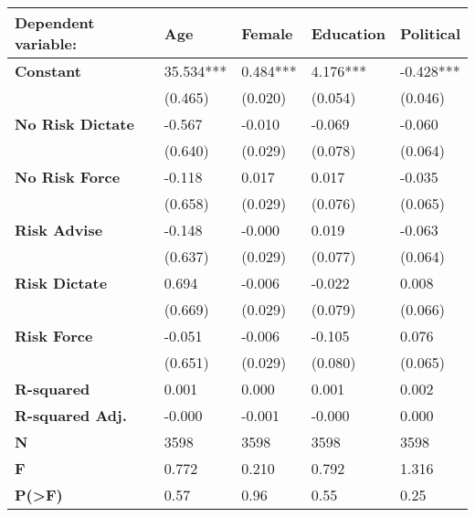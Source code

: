\begin{tabular}{lllll}
\toprule
\textbf{Dependent variable:} &        Age &    Female & Education &  Political \\
\midrule
\textbf{Constant       } &  35.534*** &  0.484*** &  4.176*** &  -0.428*** \\
                &    (0.465) &   (0.020) &   (0.054) &    (0.046) \\
\textbf{No Risk Dictate} &     -0.567 &    -0.010 &    -0.069 &     -0.060 \\
                &    (0.640) &   (0.029) &   (0.078) &    (0.064) \\
\textbf{No Risk Force  } &     -0.118 &     0.017 &     0.017 &     -0.035 \\
                &    (0.658) &   (0.029) &   (0.076) &    (0.065) \\
\textbf{Risk Advise    } &     -0.148 &    -0.000 &     0.019 &     -0.063 \\
                &    (0.637) &   (0.029) &   (0.077) &    (0.064) \\
\textbf{Risk Dictate   } &      0.694 &    -0.006 &    -0.022 &      0.008 \\
                &    (0.669) &   (0.029) &   (0.079) &    (0.066) \\
\textbf{Risk Force     } &     -0.051 &    -0.006 &    -0.105 &      0.076 \\
                &    (0.651) &   (0.029) &   (0.080) &    (0.065) \\
\textbf{R-squared      } &      0.001 &     0.000 &     0.001 &      0.002 \\
\textbf{R-squared Adj. } &     -0.000 &    -0.001 &    -0.000 &      0.000 \\
\textbf{N              } &       3598 &      3598 &      3598 &       3598 \\
\textbf{F              } &      0.772 &     0.210 &     0.792 &      1.316 \\
\textbf{P(>F)          } &       0.57 &      0.96 &      0.55 &       0.25 \\
\bottomrule
\end{tabular}
